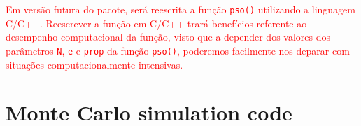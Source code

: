 \documentclass[10pt,letterpaper]{article}
\begin{document}
\textcolor{red}{Em versão futura do pacote, será reescrita a função \texttt{pso()} utilizando a linguagem C/C++. Reescrever a função em C/C++ trará benefícios referente ao desempenho computacional da função, visto que a depender dos valores dos parâmetros \texttt{N}, \texttt{e} e \texttt{prop} da função \texttt{pso()}, poderemos facilmente nos deparar com situações computacionalmente intensivas.}







\appendix

\section{Monte Carlo simulation code} \label{code:simulation_mc}
\end{document}
